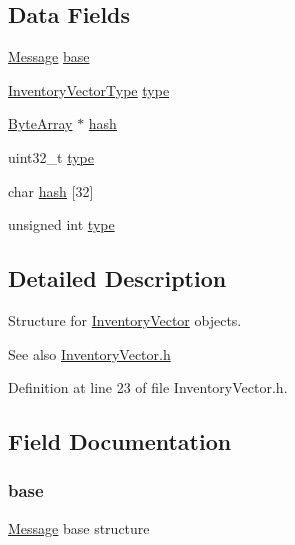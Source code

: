 \subsection*{Data Fields}
\begin{DoxyCompactItemize}
\item 
\hyperlink{struct_message}{Message} \hyperlink{struct_inventory_vector_a8987f797adf70c3e174fd64cc68bc933}{base}
\item 
\hyperlink{_constants_8h_a540a9c34662db8bb84b729512cf08e75}{InventoryVectorType} \hyperlink{struct_inventory_vector_aae693fef743079289c6c94035f7aae77}{type}
\item 
\hyperlink{struct_byte_array}{ByteArray} $\ast$ \hyperlink{struct_inventory_vector_a5309b3103b4345688327148e3c589014}{hash}
\item 
uint32\_\-t \hyperlink{struct_inventory_vector_ad44b615021ed3ccb734fcaf583ef4a03}{type}
\item 
char \hyperlink{struct_inventory_vector_a30660ee1bca7189182e64c5a192651af}{hash} \mbox{[}32\mbox{]}
\item 
unsigned int \hyperlink{struct_inventory_vector_a4bfea42429249a1f65204f0c0f34704a}{type}
\end{DoxyCompactItemize}


\subsection{Detailed Description}
Structure for \hyperlink{struct_inventory_vector}{InventoryVector} objects. 

\begin{DoxySeeAlso}{See also}
\hyperlink{_inventory_vector_8h}{InventoryVector.h} 
\end{DoxySeeAlso}


Definition at line 23 of file InventoryVector.h.



\subsection{Field Documentation}
\hypertarget{struct_inventory_vector_a8987f797adf70c3e174fd64cc68bc933}{
\subsubsection[{base}]{ {\bf base}}}
\label{struct_inventory_vector_a8987f797adf70c3e174fd64cc68bc933}
\hyperlink{struct_message}{Message} base structure 

